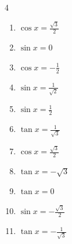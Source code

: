 \begin{multicols}{4}
\begin{enumerate}
  \item $\displaystyle \cos{x}  = \frac{\sqrt{3}}{2}$


  \item $\displaystyle \sin{x}  = 0$

        \phantom{$\displaystyle x = 0 , \pi$}

  \item $\displaystyle \cos{x}  = -\frac{1}{2}$


  \item $\displaystyle \sin{x}  = \frac{1}{\sqrt{2}}$


\columnbreak %

  \item $\displaystyle \sin{x}  = \frac{1}{2}$


  \item $\displaystyle \tan{x}  = \frac{1}{\sqrt{3}}$


  \item $\displaystyle \cos{x}  = \frac{\sqrt{3}}{2}$


  \item $\displaystyle \tan{x}  = -\sqrt{3}$


  \item $\displaystyle \tan{x}  = 0$

        \phantom{$\displaystyle x = 0 , \pi$}

  \item $\displaystyle \sin{x}  = -\frac{\sqrt{3}}{2}$


  \item $\displaystyle \tan{x}  = -\frac{1}{\sqrt{3}}$



\end{enumerate}
\end{multicols}
